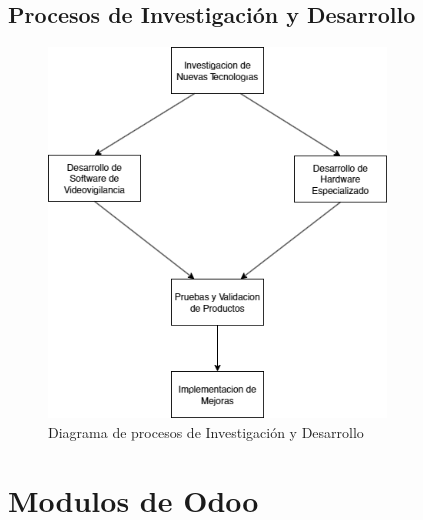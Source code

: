 \documentclass{report}
\begin{document}
        \clearpage\subsection*{Procesos de Investigación y Desarrollo}
          \begin{figure}[H]
            \centering
            \includegraphics[width=0.8\textwidth]{./img/pro_inv_des.png}
            \caption{Diagrama de procesos de Investigación y Desarrollo}
          \end{figure}
      \clearpage\section{Modulos de Odoo}
\end{document}
